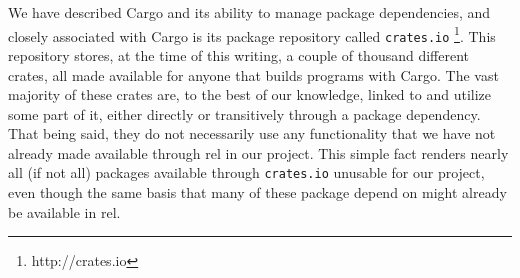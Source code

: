 We have described Cargo and its ability to manage package dependencies, and closely associated with Cargo is its package repository called \texttt{crates.io} \footnote{http://crates.io}.
This repository stores, at the time of this writing, a couple of thousand different {\rust} crates, all made available for anyone that builds {\rust} programs with Cargo.
The vast majority of these crates are, to the best of our knowledge, linked to {\std} and utilize some part of it, either directly or transitively through a package dependency.
That being said, they do not necessarily use any functionality that we have not already made available through \gls{rel} in our project.
This simple fact renders nearly all (if not all) packages available through \texttt{crates.io} unusable for our project, even though the same basis that many of these package depend on might already be available in \gls{rel}.

